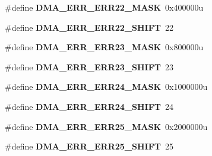 \begin{DoxyCompactItemize}
\item 
\hypertarget{group___d_m_a___register___masks_ga7fc26b8368d0be508af2d481b60bd1f4}{}\#define {\bfseries D\+M\+A\+\_\+\+E\+R\+R\+\_\+\+E\+R\+R22\+\_\+\+M\+A\+S\+K}~0x400000u\label{group___d_m_a___register___masks_ga7fc26b8368d0be508af2d481b60bd1f4}

\item 
\hypertarget{group___d_m_a___register___masks_gaf767f3e40d1d8e3c1d8a35be268ae4e4}{}\#define {\bfseries D\+M\+A\+\_\+\+E\+R\+R\+\_\+\+E\+R\+R22\+\_\+\+S\+H\+I\+F\+T}~22\label{group___d_m_a___register___masks_gaf767f3e40d1d8e3c1d8a35be268ae4e4}

\item 
\hypertarget{group___d_m_a___register___masks_ga725a3552d4a15047399b0d3ce68a205f}{}\#define {\bfseries D\+M\+A\+\_\+\+E\+R\+R\+\_\+\+E\+R\+R23\+\_\+\+M\+A\+S\+K}~0x800000u\label{group___d_m_a___register___masks_ga725a3552d4a15047399b0d3ce68a205f}

\item 
\hypertarget{group___d_m_a___register___masks_ga330516c84a22b171807f80610928ec0d}{}\#define {\bfseries D\+M\+A\+\_\+\+E\+R\+R\+\_\+\+E\+R\+R23\+\_\+\+S\+H\+I\+F\+T}~23\label{group___d_m_a___register___masks_ga330516c84a22b171807f80610928ec0d}

\item 
\hypertarget{group___d_m_a___register___masks_ga4a0822c4ae00c1b88ba0bec2b9aa8866}{}\#define {\bfseries D\+M\+A\+\_\+\+E\+R\+R\+\_\+\+E\+R\+R24\+\_\+\+M\+A\+S\+K}~0x1000000u\label{group___d_m_a___register___masks_ga4a0822c4ae00c1b88ba0bec2b9aa8866}

\item 
\hypertarget{group___d_m_a___register___masks_ga792ceba822c60c30a77d15a7f038a42a}{}\#define {\bfseries D\+M\+A\+\_\+\+E\+R\+R\+\_\+\+E\+R\+R24\+\_\+\+S\+H\+I\+F\+T}~24\label{group___d_m_a___register___masks_ga792ceba822c60c30a77d15a7f038a42a}

\item 
\hypertarget{group___d_m_a___register___masks_ga2d435f869189e213bdd67a24d06ef85d}{}\#define {\bfseries D\+M\+A\+\_\+\+E\+R\+R\+\_\+\+E\+R\+R25\+\_\+\+M\+A\+S\+K}~0x2000000u\label{group___d_m_a___register___masks_ga2d435f869189e213bdd67a24d06ef85d}

\item 
\hypertarget{group___d_m_a___register___masks_ga030218b61e12207759c2b7475cbb0ca1}{}\#define {\bfseries D\+M\+A\+\_\+\+E\+R\+R\+\_\+\+E\+R\+R25\+\_\+\+S\+H\+I\+F\+T}~25\label{group___d_m_a___register___masks_ga030218b61e12207759c2b7475cbb0ca1}


\end{DoxyCompactItemize}
